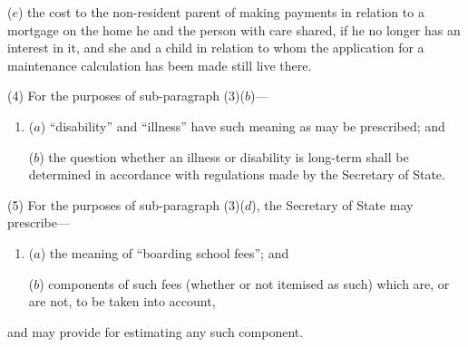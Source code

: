 \documentclass[a4paper]{article}
\begin{document}
{\begin{enumerate}
($e$) the cost to the non-resident parent of making payments in relation to a mortgage on the home he and the person with care shared, if he no longer has an interest in it, and she and a child in relation to whom the application for a maintenance calculation has been made still live there.
\end{enumerate}

(4) For the purposes of sub-paragraph (3)($b$)---
\begin{enumerate}\item[]
($a$) “disability” and “illness” have such meaning as may be prescribed; and

($b$) the question whether an illness or disability is long-term shall be determined in accordance with regulations made by the Secretary of State.
\end{enumerate}

(5) For the purposes of sub-paragraph (3)($d$), the Secretary of State may prescribe---
\begin{enumerate}\item[]
($a$) the meaning of “boarding school fees”; and

($b$) components of such fees (whether or not itemised as such) which are, or are not, to be taken into account,
\end{enumerate}
and may provide for estimating any such component.

}
\end{document}
